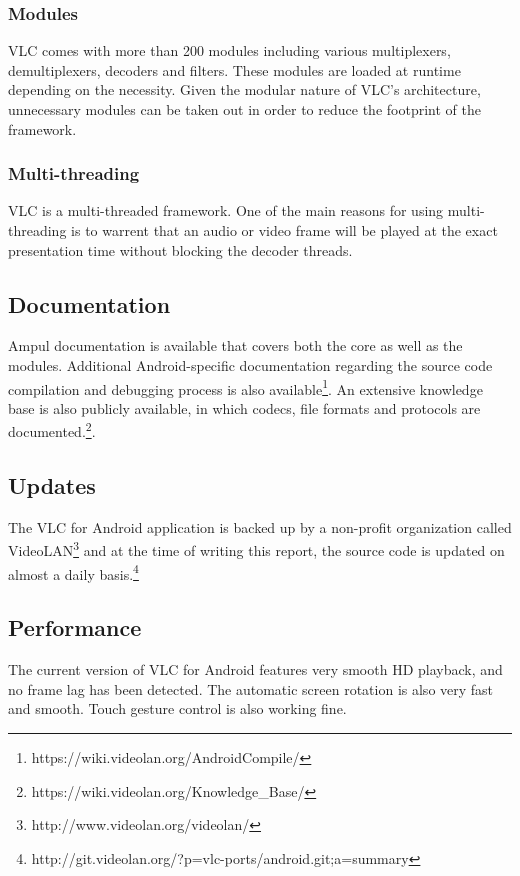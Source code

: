 \subsubsection{Modules}
VLC comes with more than 200 modules including various multiplexers, demultiplexers, decoders and filters. These modules are loaded at runtime depending on the necessity. Given the modular nature of VLC's architecture, unnecessary modules can be taken out in order to reduce the footprint of the framework.
\subsubsection{Multi-threading}
VLC is a multi-threaded framework. One of the main reasons for using multi-threading is to warrent that an audio or video frame will be played at the exact presentation time without blocking the decoder threads.
\subsection{Documentation}
Ampul documentation is available that covers both the core as well as the modules. Additional Android-specific documentation regarding the source code compilation and debugging process is also available\footnote{https://wiki.videolan.org/AndroidCompile/}. An extensive knowledge base is also publicly available, in which codecs, file formats and protocols are documented.\footnote{https://wiki.videolan.org/Knowledge\_Base/}.
\subsection{Updates}
The VLC for Android application is backed up by a non-profit organization called VideoLAN\footnote{http://www.videolan.org/videolan/} and at the time of writing this report, the source code is updated on almost a daily basis.\footnote{http://git.videolan.org/?p=vlc-ports/android.git;a=summary}
\subsection{Performance}
The current version of VLC for Android features very smooth HD playback, and no frame lag has been detected. The automatic screen rotation is also very fast and smooth. Touch gesture control is also working fine.


